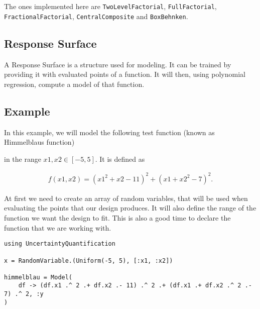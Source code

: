 The ones implemented here are \texttt{TwoLevelFactorial}, \texttt{FullFactorial}, \texttt{FractionalFactorial}, \texttt{CentralComposite} and \texttt{BoxBehnken}.



\subsection{Response Surface}



\label{11236368157692582757}{}


A Response Surface is a structure used for modeling.     It can be trained by providing it with evaluated points of a function.     It will then, using polynomial regression, compute a model of that function.



\subsection{Example}



\label{12204569949998619624}{}


In this example, we will model the following test function (known as Himmelblau{\textquotesingle}s function)



in the range \(x1, x2 ∈ [-5, 5]\). It is defined as



\begin{equation*}
\begin{split}f(x1, x2) = (x1^2 + x2 - 11)^2 + (x1 + x2^2 - 7)^2.\end{split}\end{equation*}




\begin{figure}
\centering
{}
\caption{}
\end{figure}
 At first we need to create an array of random variables, that will be used when evaluating the points that our design produces. It will also define the range of the function we want the design to fit. This is also a good time to declare the function that we are working with.




\begin{verbatim}
using UncertaintyQuantification

x = RandomVariable.(Uniform(-5, 5), [:x1, :x2])

himmelblau = Model(
    df -> (df.x1 .^ 2 .+ df.x2 .- 11) .^ 2 .+ (df.x1 .+ df.x2 .^ 2 .- 7) .^ 2, :y
)
\end{verbatim}


